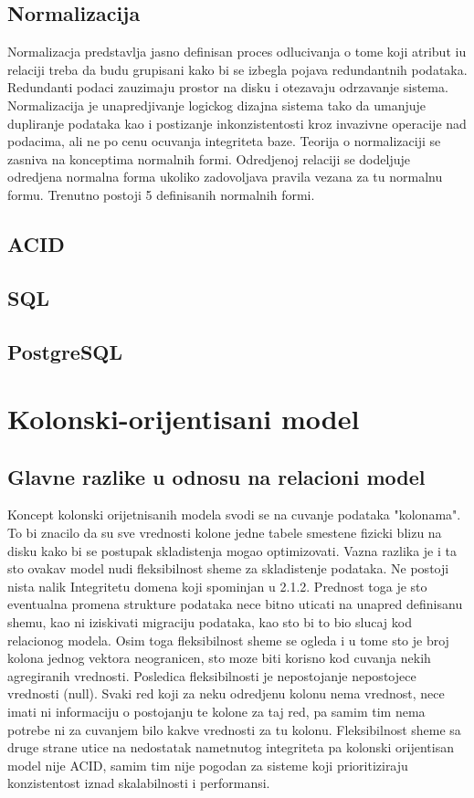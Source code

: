 \documentclass[12pt,oneside]{memoir}
\begin{document}
\subsection{Normalizacija}
Normalizacja predstavlja jasno definisan proces odlucivanja o tome koji atribut iu relaciji treba da budu grupisani kako bi se izbegla pojava redundantnih podataka. Redundanti podaci zauzimaju prostor na disku i otezavaju odrzavanje sistema. Normalizacija je unapredjivanje  logickog dizajna sistema tako da umanjuje dupliranje podataka kao i postizanje inkonzistentosti kroz invazivne operacije nad podacima, ali ne po cenu ocuvanja integriteta baze. Teorija o normalizaciji se zasniva na konceptima normalnih formi. Odredjenoj relaciji se dodeljuje odredjena normalna forma ukoliko zadovoljava pravila vezana za tu normalnu formu. Trenutno postoji 5 definisanih normalnih formi.
\subsection{ACID}
\subsection{SQL}
\subsection{PostgreSQL}
\section{Kolonski-orijentisani model}
\subsection{Glavne razlike u odnosu na relacioni model}
Koncept kolonski orijetnisanih modela svodi se na cuvanje podataka "kolonama". To bi znacilo da su sve vrednosti kolone jedne tabele smestene fizicki blizu na disku kako bi se postupak skladistenja mogao optimizovati. Vazna razlika je i ta sto ovakav model nudi fleksibilnost sheme za skladistenje podataka. Ne postoji nista nalik Integritetu domena koji spominjan u 2.1.2. Prednost toga je sto eventualna promena strukture podataka nece bitno uticati na unapred definisanu shemu, kao ni iziskivati migraciju podataka, kao sto bi to bio slucaj kod relacionog modela. Osim toga fleksibilnost sheme se ogleda i u tome sto je broj kolona jednog vektora neogranicen, sto moze biti korisno kod cuvanja nekih agregiranih vrednosti. Posledica fleksibilnosti je nepostojanje nepostojece vrednosti (null). Svaki red koji za neku odredjenu kolonu nema vrednost, nece imati ni informaciju o postojanju te kolone za taj red, pa samim tim nema potrebe ni za cuvanjem bilo kakve vrednosti za tu kolonu. Fleksibilnost sheme sa druge strane utice na nedostatak nametnutog integriteta pa kolonski orijentisan model nije ACID, samim tim nije pogodan za sisteme koji prioritiziraju konzistentost iznad skalabilnosti i performansi.
\end{document}
